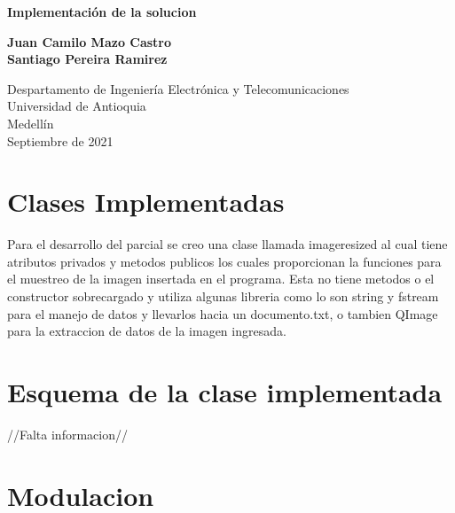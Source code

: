 \documentclass{article}
\begin{document}
\begin{titlepage}
    \begin{center}
        \vspace*{1cm}
            
        \Huge
        \textbf{Implementación de la solucion}
            
        \vspace{0.5cm}
        \LARGE
        
            
        \vspace{1.5cm}
            
        \textbf{Juan Camilo Mazo Castro}\\
        \textbf{Santiago Pereira Ramirez}
            
        \vfill
            
        \vspace{0.8cm}
            
        \Large
        Despartamento de Ingeniería Electrónica y Telecomunicaciones\\
        Universidad de Antioquia\\
        Medellín\\
        Septiembre de 2021
            
    \end{center}
\end{titlepage}

\tableofcontents
\newpage
\section{Clases Implementadas}\label{intro}
Para el desarrollo del parcial se creo una clase llamada imageresized al cual tiene atributos privados y metodos publicos los cuales proporcionan la funciones para el muestreo de la imagen insertada en el programa. Esta no tiene metodos o el constructor sobrecargado y utiliza algunas libreria como lo son string y fstream para el manejo de datos y llevarlos hacia un documento.txt, o tambien QImage para la extraccion de datos de la imagen ingresada.


\section{Esquema de la clase implementada }\label{contenido}

//Falta informacion//

\section{Modulacion}\label{contenido}
\end{document}
